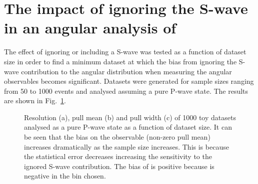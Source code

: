 \section{The impact of ignoring the S-wave in an angular analysis of \BdToKstll}
\label{sec:swave:ignore}

The effect of ignoring or including a \kpi S-wave was tested as a function of dataset 
 size in order to find a minimum dataset at which the bias 
 from ignoring the S-wave contribution to the angular distribution when measuring the angular observables becomes significant.
Datasets were generated for sample sizes ranging from 50 to 
1000 events and analysed assuming a pure P-wave state. 
The results are shown in Fig.~\ref{fig:bias}. 
\begin{figure}[tb]
\centering
{}
\caption[ Resolution, pull mean and width of 
1000 toy datasets analysed as a pure P-wave state as a 
function of dataset size.    ]
{Resolution (a), pull mean (b) and pull width (c) of 
1000 toy datasets analysed as a pure P-wave state as a 
function of dataset size. It can be seen that the bias 
on the observable (non-zero pull mean) increases dramatically as the sample 
size increases. This is because the statistical error 
decreases increasing the sensitivity to the ignored S-wave 
contribution. The bias of \AFB is positive  
because \AFB is negative in the \qsq bin chosen. 
~\label{fig:bias}}
\end{figure}

